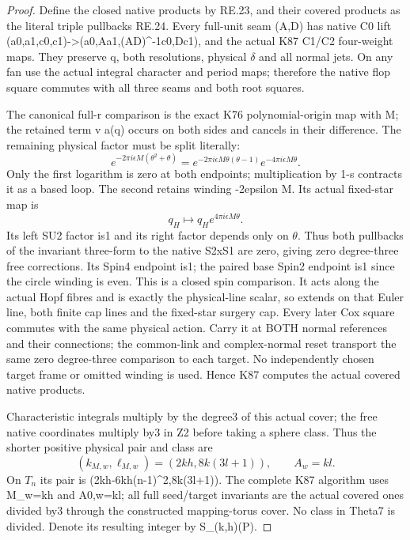 \begin{proof}
\par\nobreak

Define the closed native products by RE.23, and their covered products
as the literal triple pullbacks RE.24. Every full-unit seam (A,D) has
native C0 lift (a0,a1,c0,c1)-\textgreater(a0,Aa1,(AD)\^{}-1c0,Dc1), and the actual
K87 C1/C2 four-weight maps. They preserve q, both resolutions, physical
\(\delta\) and all normal jets. On any fan use the actual integral character
and period maps; therefore the native flop square commutes with all
three seams and both root squares.

The canonical full-r comparison is the exact K76 polynomial-origin map
with M; the retained term v a(q) occurs on both sides and cancels in
their difference. The remaining physical factor must be split literally:
\[
e^{-2\pi i\epsilon M(\theta^2+\theta)}
=e^{-2\pi i\epsilon M\theta(\theta-1)}
                          e^{-4\pi i\epsilon M\theta}.\tag{RE.25}
\]
Only the first logarithm is zero at both endpoints; multiplication by
1-s contracts it as a based loop. The second retains winding -2epsilon M.
Its actual fixed-star map is
\[
                         q_H\longmapsto q_H e^{4\pi i\epsilon M\theta}.
\tag{RE.26}
\]
Its left SU2 factor is1 and its right factor depends only on \(\theta\).
Thus both pullbacks of the invariant three-form to the native S2xS1
are zero, giving zero degree-three free corrections. Its Spin4 endpoint
is1; the paired base Spin2 endpoint is1 since the circle winding is
even. This is a closed spin comparison. It acts along the actual Hopf
fibres and is exactly the physical-line scalar, so extends on that
Euler line, both finite cap lines and the fixed-star surgery cap.
Every later Cox square commutes with the same physical action. Carry
it at BOTH normal references and their connections; the common-link
and complex-normal reset transport the same zero degree-three comparison
to each target. No independently chosen target frame or omitted winding
is used. Hence K87 computes the actual covered native products.

Characteristic integrals multiply by the degree3 of this actual cover;
the free native coordinates multiply by3 in Z2 before taking a sphere
class. Thus the shorter positive physical pair and class are
\[
(k_{M,w},\ell_{M,w})=(2kh,8k(3l+1)),\qquad A_w=kl.\tag{RE.27}
\]
On \(T_n\) its pair is (2kh-6kh(n-1)\^{}2,8k(3l+1)). The complete K87
algorithm uses M\_w=kh and A0,w=kl; all full seed/target invariants
are the actual covered ones divided by3 through the constructed
mapping-torus cover. No class in Theta7 is divided. Denote its resulting
integer by S\_(k,h)(P).


\end{proof}
